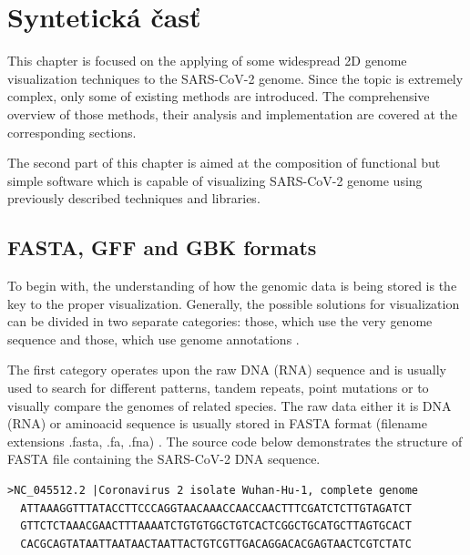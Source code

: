 
\chapter{Syntetická časť}

This chapter is focused on the applying of some widespread 2D genome visualization techniques to the SARS-CoV-2 genome. 
Since the topic is extremely complex, only some of existing methods are introduced.
The comprehensive overview of those methods, their analysis and implementation are covered at the corresponding sections.

The second part of this chapter is aimed at the composition of functional but simple software which is capable of visualizing SARS-CoV-2 genome using previously described techniques and libraries.

\section{FASTA, GFF and GBK formats}

To begin with, the understanding of how the genomic data is being stored is the key to the proper visualization.
Generally, the possible solutions for visualization can be divided in two separate categories: those, which use the very genome sequence and those, which use genome annotations \cite{covvisual}.

The first category operates upon the raw DNA (RNA) sequence and is usually used to search for different patterns, tandem repeats, point mutations or to visually compare the genomes of related species.
The raw data either it is DNA (RNA) or aminoacid sequence is usually stored in FASTA format (filename extensions .fasta, .fa, .fna) \cite{fasta}.
The source code below demonstrates the structure of FASTA file containing the SARS-CoV-2 DNA sequence.

\begin{lstlisting}[caption={First 180 nucleotides from SARS-CoV-2 genome sequence in FASTA format. The description line, which begins with '>', contains information about the sequence. Following the initial line is the actual sequence itself in standard one-letter character string.},captionpos=b]
  >NC_045512.2 |Coronavirus 2 isolate Wuhan-Hu-1, complete genome
  ATTAAAGGTTTATACCTTCCCAGGTAACAAACCAACCAACTTTCGATCTCTTGTAGATCT
  GTTCTCTAAACGAACTTTAAAATCTGTGTGGCTGTCACTCGGCTGCATGCTTAGTGCACT
  CACGCAGTATAATTAATAACTAATTACTGTCGTTGACAGGACACGAGTAACTCGTCTATC
\end{lstlisting}


